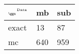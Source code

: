 \begin{tabular}{lll}
    \toprule
    $_{\text{\tiny{\ggn}}}$$^{\text{\tiny{Data}}}$ & mb & sub \\
    \midrule
    exact & 13
              & 87 \\
    mc   & 640
              & 959 \\
    \bottomrule
\end{tabular}